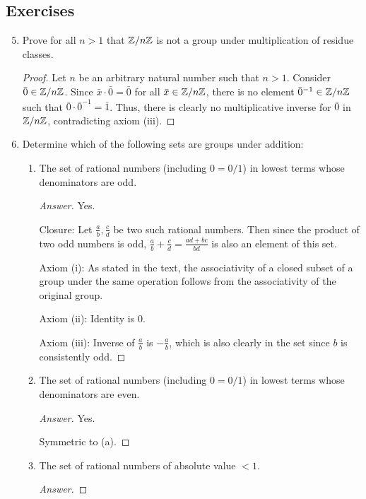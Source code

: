 \documentclass[../notes.tex]{subfiles}
\begin{document}
\subsection*{Exercises}
\begin{enumerate}[label={\textbf{\arabic*.}}]
    \setcounter{enumi}{4}
    \item Prove for all $n>1$ that $\mathbb{Z}/n\mathbb{Z}$ is not a group under multiplication of residue classes.
    \begin{proof}
        Let $n$ be an arbitrary natural number such that $n>1$. Consider $\bar{0}\in\mathbb{Z}/n\mathbb{Z}$. Since $\bar{x}\cdot\bar{0}=\bar{0}$ for all $\bar{x}\in\mathbb{Z}/n\mathbb{Z}$, there is no element $\bar{0}^{-1}\in\mathbb{Z}/n\mathbb{Z}$ such that $\bar{0}\cdot\bar{0}^{-1}=\bar{1}$. Thus, there is clearly no multiplicative inverse for $\bar{0}$ in $\mathbb{Z}/n\mathbb{Z}$, contradicting axiom (iii).
    \end{proof}
    \item Determine which of the following sets are groups under addition:
    \begin{enumerate}[label={\textbf{(\alph*)}}]
        \item The set of rational numbers (including $0=0/1$) in lowest terms whose denominators are odd.
        \begin{proof}[Answer]
            Yes.\par
            Closure: Let $\frac{a}{b},\frac{c}{d}$ be two such rational numbers. Then since the product of two odd numbers is odd, $\frac{a}{b}+\frac{c}{d}=\frac{ad+bc}{bd}$ is also an element of this set.\par
            Axiom (i): As stated in the text, the associativity of a closed subset of a group under the same operation follows from the associativity of the original group.\par
            Axiom (ii): Identity is 0.\par
            Axiom (iii): Inverse of $\frac{a}{b}$ is $-\frac{a}{b}$, which is also clearly in the set since $b$ is consistently odd.
        \end{proof}
        \item The set of rational numbers (including $0=0/1$) in lowest terms whose denominators are even.
        \begin{proof}[Answer]
            Yes.\par
            Symmetric to (a).
        \end{proof}
        \item The set of rational numbers of absolute value $<1$.
        \begin{proof}[Answer]

\end{proof}
\end{enumerate}
\end{enumerate}
\end{document}
